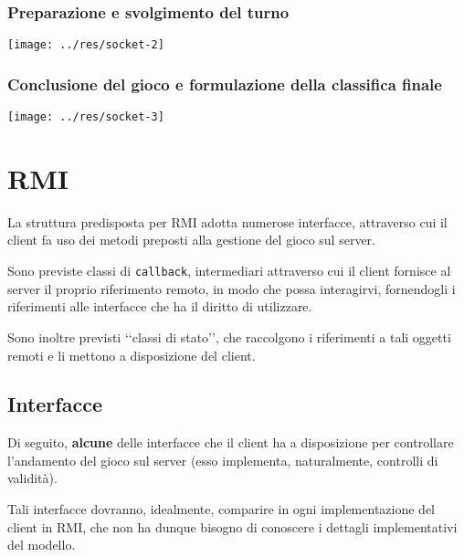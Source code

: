 \documentclass[a4paper,11pt]{article} %
\begin{document}
    \newpage

    \subsubsection{Preparazione e svolgimento del turno}

    \texttt{[image: ../res/socket-2]}

    \newpage

    \subsubsection{Conclusione del gioco e formulazione della classifica finale}

    \texttt{[image: ../res/socket-3]}


    \newpage


    \section{RMI}\label{sec:rmi}

    La struttura predisposta per RMI adotta numerose interfacce, attraverso cui il client fa uso dei metodi preposti alla gestione del gioco sul server.

    \smallskip

    Sono previste classi di \texttt{callback}, intermediari attraverso cui il client fornisce al server il proprio riferimento remoto, in modo che possa interagirvi,
    fornendogli i riferimenti alle interfacce che ha il diritto di utilizzare.

    \smallskip

    Sono inoltre previsti ‘‘classi di stato’’, che raccolgono i riferimenti a tali oggetti remoti e li mettono a disposizione del client.

    \subsection{Interfacce}\label{subsec:interfacce}

    Di seguito, \textbf{alcune} delle interfacce che il client ha a disposizione per controllare l'andamento del gioco sul server (esso implementa, naturalmente, controlli di validità).

    Tali interfacce dovranno, idealmente, comparire in ogni implementazione del client in RMI, che non ha dunque bisogno di conoscere i dettagli implementativi del modello.
\end{document}
